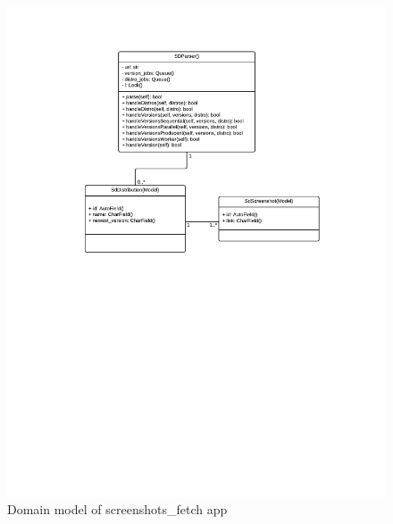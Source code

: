 \documentclass[thesis=B,english]{FITthesis}[2013/04/26]
\begin{document}
\begin{figure}[h!]
	\advance\leftskip 1cm
	\includegraphics[trim=4cm 13cm 3cm 2cm, clip=true, totalheight=300pt]{images/back_screenshots_fetch.pdf}
	\caption{Domain model of screenshots\_fetch app}
\end{figure}
\end{document}
